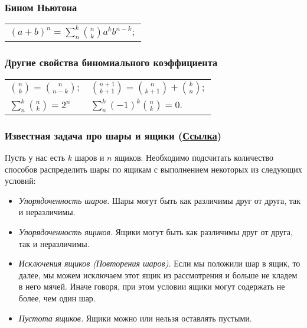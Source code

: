 \subsubsection{Бином Ньютона}
\begin{longtable}[l]{l}
	$(a+b)^n=\sum^{k}_n \binom{n}{k} a^k b^{n-k};$
\end{longtable}

\subsubsection{Другие свойства биномиального коэффициента}

\begin{longtable}[l]{l l}
$\binom{n}{k}=\binom{n}{n-k}; $
&  $\binom{n+1}{k+1}=\binom{n}{k+1}+\binom{k}{n};$ 
\\
$\sum^{k}_n \binom{n}{k}=2^n$ 
& $\sum^{k}_n (-1)^k \binom{n}{k}=0.$
\end{longtable}

\subsubsection{Известная задача про шары и ящики (\href{http://cns-web.bu.edu/~eric/EC500/attachments/ON(2d)LINE(20)READINGS/ballsinboxe.pdf}{Ссылка})}

Пусть у нас есть $k$ шаров и $n$ ящиков. Необходимо подсчитать количество способов распределить шары по ящикам с выполнением некоторых из следующих условий:
\begin{itemize}
\item \textit{Упорядоченность шаров.} Шары могут быть как различимы друг от друга, так и неразличимы. 
\item \textit{Упорядоченность ящиков.} Ящики могут быть как различимы друг от друга, так и неразличимы. 
\item \textit{Исключения ящиков (Повторения шаров).} Если мы положили шар в ящик, то далее, мы можем исключаем этот ящик из рассмотрения и больше не кладем в него мячей. Иначе говоря, при этом условии ящики могут содержать не более, чем один шар.
\item \textit{Пустота ящиков.} Ящики можно или нельзя оставлять пустыми.
\end{itemize}

